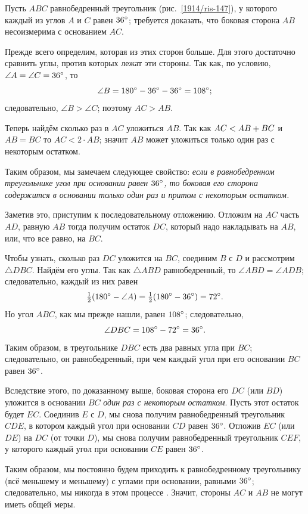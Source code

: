 \documentclass[twoside]{book}
\begin{document}
Пусть $ABC$ равнобедренный треугольник (рис.~\ref{1914/ris-147}), у которого каждый из углов $A$ и $C$ равен $36\degree$; 
требуется доказать, что боковая сторона $AB$ несоизмерима с основанием $AC$.

Прежде всего определим, которая из этих сторон больше.
Для этого достаточно сравнить углы, против которых лежат эти стороны.
Так как, по условию, $\angle A=\angle C=36\degree$, то 
\[\angle B=180\degree-36\degree-36\degree=108\degree;\]
следовательно, $\angle B>\angle C$;
поэтому $AC>AB$.

Теперь найдём сколько раз в $AC$ уложиться $AB$.
Так как $AC\z<AB+BC$ и $AB=BC$ то $AC<2\cdot AB$;
значит $AB$ может уложиться только один раз с некоторым остатком.

Таким образом, мы замечаем следующее свойство:
\emph{если в равнобедренном треугольнике угол при основании равен $36\degree$, то боковая его сторона содержится в основании только один раз и притом с некоторым остатком.}

Заметив это, приступим к последовательному отложению.
Отложим на $AC$ часть $AD$, равную $AB$ тогда получим остаток $DC$, который надо накладывать на $AB$, или, что все равно, на $BC$.

Чтобы узнать, сколько раз $DC$ уложится на $BC$, соединим $B$ с $D$ и рассмотрим $\triangle DBC$.
Найдём его углы.
Так как $\triangle ABD$ равнобедренный, то $\angle ABD = \angle ADB$;
следовательно, каждый из них равен 
\[\tfrac12(180\degree -\angle A)=\tfrac12(180\degree -36\degree)=72\degree.\]
Но угол $ABC$, как мы прежде нашли, равен $108\degree$; следовательно, 
\[\angle DBC=108\degree-72\degree=36\degree.\]
Таким образом, в треугольнике $DBC$ есть два равных угла при $BC$; следовательно, он равнобедренный, при чем каждый угол при его основании $BC$ равен $36\degree$.

Вследствие этого, по доказанному выше, боковая сторона его $DC$
(или $BD$) уложится в основании $BC$ \emph{один раз с некоторым остатком}.
Пусть этот остаток будет $EC$.
Соединив $E$ с $D$, мы снова получим равнобедренный треугольник $CDE$, в котором каждый угол при основании $CD$ равен $36\degree$.
Отложив $EC$ (или $DE$) на $DC$ (от точки $D$), мы снова получим равнобедренный треугольник $CEF$, у которого каждый угол при основании $CE$ равен $36\degree$.

Таким образом, мы постоянно будем приходить к равнобедренному треугольнику (всё меньшему и меньшему) с углами при основании, равными $36\degree$;
следовательно, мы никогда в этом процессе .
Значит, стороны $AC$ и $AB$ не могут иметь общей меры.
\end{document}
